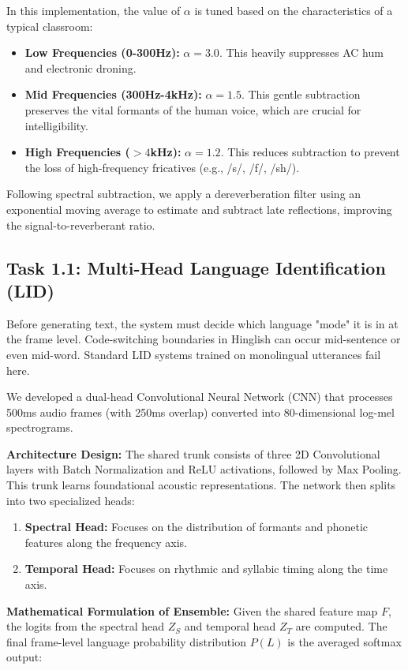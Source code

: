 \documentclass[conference]{IEEEtran}
\begin{document}
In this implementation, the value of $\alpha$ is tuned based on the characteristics of a typical classroom:
\begin{itemize}
    \item \textbf{Low Frequencies (0-300Hz):} $\alpha = 3.0$. This heavily suppresses AC hum and electronic droning.
    \item \textbf{Mid Frequencies (300Hz-4kHz):} $\alpha = 1.5$. This gentle subtraction preserves the vital formants of the human voice, which are crucial for intelligibility.
    \item \textbf{High Frequencies ($>4$kHz):} $\alpha = 1.2$. This reduces subtraction to prevent the loss of high-frequency fricatives (e.g., /s/, /f/, /sh/).
\end{itemize}

Following spectral subtraction, we apply a dereverberation filter using an exponential moving average to estimate and subtract late reflections, improving the signal-to-reverberant ratio.

\subsection{Task 1.1: Multi-Head Language Identification (LID)}

Before generating text, the system must decide which language "mode" it is in at the frame level. Code-switching boundaries in Hinglish can occur mid-sentence or even mid-word. Standard LID systems trained on monolingual utterances fail here.

We developed a dual-head Convolutional Neural Network (CNN) that processes 500ms audio frames (with 250ms overlap) converted into 80-dimensional log-mel spectrograms. 

\textbf{Architecture Design:} The shared trunk consists of three 2D Convolutional layers with Batch Normalization and ReLU activations, followed by Max Pooling. This trunk learns foundational acoustic representations. The network then splits into two specialized heads:
\begin{enumerate}
    \item \textbf{Spectral Head:} Focuses on the distribution of formants and phonetic features along the frequency axis.
    \item \textbf{Temporal Head:} Focuses on rhythmic and syllabic timing along the time axis.
\end{enumerate}

\textbf{Mathematical Formulation of Ensemble:}
Given the shared feature map $F$, the logits from the spectral head $Z_S$ and temporal head $Z_T$ are computed. The final frame-level language probability distribution $P(L)$ is the averaged softmax output:
\end{document}
